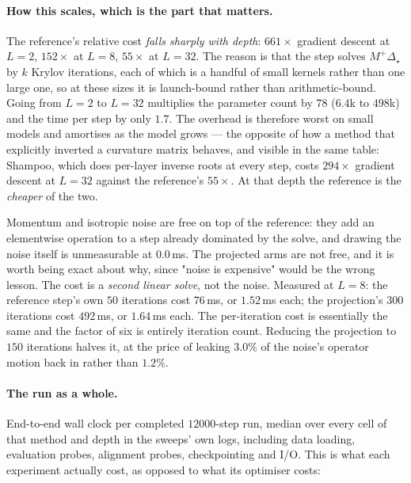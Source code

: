 \documentclass{article} %
\theoremstyle{plain}
\theoremstyle{definition}
\theoremstyle{remark}
\begin{document}
\paragraph{How this scales, which is the part that matters.} The reference's relative cost
\emph{falls sharply with depth}: $661\times$ gradient descent at $L=2$, $152\times$ at $L=8$,
$55\times$ at $L=32$. The reason is that the step solves $M^{+}\Delta_\star$ by $k$ Krylov
iterations, each of which is a handful of small kernels rather than one large one, so at these
sizes it is launch-bound rather than arithmetic-bound. Going from $L=2$ to $L=32$ multiplies the
parameter count by $78$ ($6.4$k to $498$k) and the time per step by only $1.7$. The overhead is
therefore worst on small models and amortises as the model grows --- the opposite of how a method
that explicitly inverted a curvature matrix behaves, and visible in the same table: Shampoo, which
does per-layer inverse roots at every step, costs $294\times$ gradient descent at $L=32$ against
the reference's $55\times$. At that depth the reference is the \emph{cheaper} of the two.

Momentum and isotropic noise are free on top of the reference: they add an elementwise operation
to a step already dominated by the solve, and drawing the noise itself is unmeasurable at
$0.0$\,ms. The projected arms are not free, and it is worth being exact about why, since "noise is
expensive" would be the wrong lesson. The cost is a \emph{second linear solve}, not the noise.
Measured at $L=8$: the reference step's own $50$ iterations cost $76$\,ms, or $1.52$\,ms each; the
projection's $300$ iterations cost $492$\,ms, or $1.64$\,ms each. The per-iteration cost is
essentially the same and the factor of six is entirely iteration count. Reducing the projection to
$150$ iterations halves it, at the price of leaking $3.0\%$ of the noise's operator motion back in
rather than $1.2\%$.

\paragraph{The run as a whole.} End-to-end wall clock per completed $12000$-step run, median over
every cell of that method and depth in the sweeps' own logs, including data loading, evaluation
probes, alignment probes, checkpointing and I/O. This is what each experiment actually cost, as
opposed to what its optimiser costs:
\end{document}
